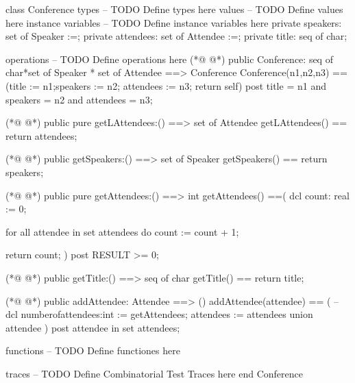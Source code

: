 \begin{vdmpp}[breaklines=true]
class Conference
types
-- TODO Define types here
values
-- TODO Define values here
instance variables
-- TODO Define instance variables here
   private speakers: set of Speaker :={};
  private attendees: set of Attendee :={};
  private title: seq of char;
  
operations
-- TODO Define operations here
(*@
\label{Conference:14}
@*)
  public Conference:  seq of char*set of Speaker * set of Attendee ==> Conference
  Conference(n1,n2,n3) == (title := n1;speakers := n2; attendees := n3; return self)
  post title = n1 and speakers = n2 and attendees = n3; 
  
(*@
\label{getLAttendees:18}
@*)
  public pure getLAttendees:() ==> set of Attendee
  getLAttendees() == return attendees;
  
(*@
\label{getSpeakers:21}
@*)
  public getSpeakers:() ==> set of Speaker
  getSpeakers() == return speakers;
   
(*@
\label{getAttendees:24}
@*)
  public pure getAttendees:() ==> int
  getAttendees() ==(
     dcl count: real := 0;
     
     for all attendee in set attendees
        do count := count + 1;
     
     return count;
  )
  post RESULT >= 0;
  
  
(*@
\label{getTitle:36}
@*)
  public getTitle:() ==> seq of char
  getTitle() == return title;
  
(*@
\label{addAttendee:39}
@*)
  public addAttendee: Attendee ==> ()
  addAttendee(attendee) == (
 -- dcl numberofattendees:int := getAttendees;
  attendees := attendees union {attendee}
  )
  post attendee in set attendees;
  
  
functions
-- TODO Define functiones here
  
traces
-- TODO Define Combinatorial Test Traces here
end Conference
\end{vdmpp}
